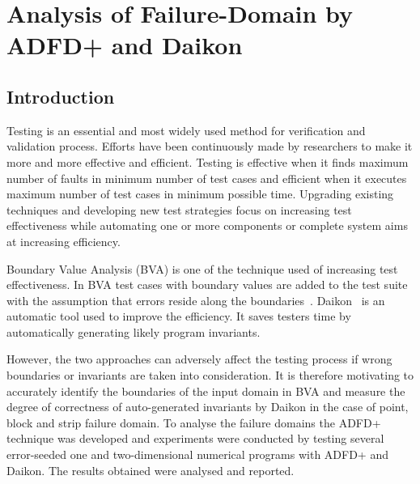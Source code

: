
\chapter{Analysis of Failure-Domain by ADFD+ and Daikon}
\label{chap:ADFD+}

\section{Introduction}\label{sec:intro6}
Testing is an essential and most widely used method for verification and validation process. Efforts have been continuously made by researchers to make it more and more effective and efficient. Testing is effective when it finds maximum number of faults in minimum number of test cases and efficient when it executes maximum number of test cases in minimum possible time. Upgrading existing techniques and developing new test strategies focus on increasing test effectiveness while automating one or more components or complete system aims at increasing efficiency.

Boundary Value Analysis (BVA) is one of the technique used of increasing test effectiveness. In BVA test cases with boundary values are added to the test suite with the assumption that errors reside along the boundaries~\cite{radatz1990ieee}. Daikon~\cite{ernst2007daikon} is an automatic tool used to improve the efficiency. It saves testers time by automatically generating likely program invariants.

However, the two approaches can adversely affect the testing process if wrong boundaries or invariants are taken into consideration. It is therefore motivating to accurately identify the boundaries of the input domain in BVA and measure the degree of correctness of auto-generated invariants by Daikon in the case of point, block and strip failure domain. To analyse the failure domains the ADFD+ technique was developed and experiments were conducted by testing several error-seeded one and two-dimensional numerical programs with ADFD+ and Daikon. The results obtained were analysed and reported.  

